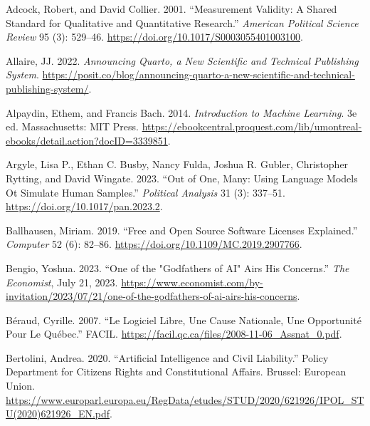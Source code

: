 \documentclass[
  letterpaper,
]{scrbook}
\newlength{\cslhangindent}
\newlength{\cslentryspacingunit} %
\newenvironment{CSLReferences}[2] %
 {%
  \setlength{\parindent}{0pt}
  \ifodd #1
  \let\oldpar\par
  \def\par{\hangindent=\cslhangindent\oldpar}
  \fi
  \setlength{\parskip}{#2\cslentryspacingunit}
 }%
 {}
\begin{document}
\hypertarget{refs}{}
\begin{CSLReferences}{1}{0}
\leavevmode{}%
Adcock, Robert, and David Collier. 2001. {``Measurement {Validity}: {A
Shared Standard} for {Qualitative} and {Quantitative Research}.''}
\emph{American Political Science Review} 95 (3): 529--46.
\url{https://doi.org/10.1017/S0003055401003100}.

\leavevmode{}%
Allaire, JJ. 2022. \emph{Announcing {Quarto}, a New Scientific and
Technical Publishing System}.
\url{https://posit.co/blog/announcing-quarto-a-new-scientific-and-technical-publishing-system/}.

\leavevmode{}%
Alpaydin, Ethem, and Francis Bach. 2014. \emph{Introduction to {Machine
Learning}}. 3e ed. {Massachusetts}: {MIT Press}.
\url{https://ebookcentral.proquest.com/lib/umontreal-ebooks/detail.action?docID=3339851}.

\leavevmode{}%
Argyle, Lisa P., Ethan C. Busby, Nancy Fulda, Joshua R. Gubler,
Christopher Rytting, and David Wingate. 2023. {``Out of {One}, {Many}:
{Using Language Models} Ot {Simulate Human Samples}.''} \emph{Political
Analysis} 31 (3): 337--51. \url{https://doi.org/10.1017/pan.2023.2}.

\leavevmode{}%
Ballhausen, Miriam. 2019. {``Free and {Open Source Software Licenses
Explained}.''} \emph{Computer} 52 (6): 82--86.
\url{https://doi.org/10.1109/MC.2019.2907766}.

\leavevmode{}%
Bengio, Yoshua. 2023. {``One of the "Godfathers of {AI}" Airs His
Concerns.''} \emph{The Economist}, July 21, 2023.
\url{https://www.economist.com/by-invitation/2023/07/21/one-of-the-godfathers-of-ai-airs-his-concerns}.

\leavevmode{}%
Béraud, Cyrille. 2007. {``Le Logiciel Libre, Une Cause Nationale, Une
Opportunité Pour Le {Québec}.''} {FACIL}.
\url{https://facil.qc.ca/files/2008-11-06_Assnat_0.pdf}.

\leavevmode{}%
Bertolini, Andrea. 2020. {``Artificial {Intelligence} and {Civil
Liability}.''} Policy Department for Citizen\textquotesingle s Rights
and Constitutional Affairs. {Brussel}: {European Union}.
\url{https://www.europarl.europa.eu/RegData/etudes/STUD/2020/621926/IPOL_STU(2020)621926_EN.pdf}.


\end{CSLReferences}
\end{document}

